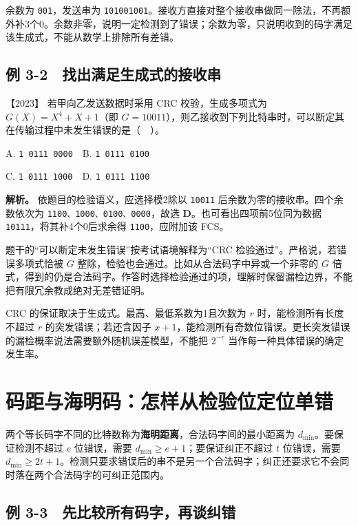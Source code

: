 余数为 \allowbreak{}\texttt{001}，发送串为 \allowbreak{}\texttt{101001001}。接收方直接对整个接收串做同一除法，不再额外补3个0。余数非零，说明一定检测到了错误；余数为零，只说明收到的码字满足该生成式，不能从数学上排除所有差错。

\subsection{例 3-2　找出满足生成式的接收串}\label{cn-ex3-2}

\noindent{}【2023】 若甲向乙发送数据时采用 CRC 校验，生成多项式为 \(G(X)=X^4+X+1\)（即 \(G=10011\)），则乙接收到下列比特串时，可以断定其在传输过程中未发生错误的是（　）。

A. \allowbreak{}\texttt{1\ 0111\ 0000}　B. \allowbreak{}\texttt{1\ 0111\ 0100}

C. \allowbreak{}\texttt{1\ 0111\ 1000}　D. \allowbreak{}\texttt{1\ 0111\ 1100}


\textbf{解析。} 依题目的检验语义，应选择模2除以 \allowbreak{}\texttt{10011} 后余数为零的接收串。四个余数依次为 \allowbreak{}\texttt{1100、1000、0100、0000}，故选 \textbf{D}。也可看出四项前5位同为数据 \allowbreak{}\texttt{10111}，将其补4个0后求余得 \allowbreak{}\texttt{1100}，应附加该 FCS。

题干的``可以断定未发生错误''按考试语境解释为``CRC 检验通过''。严格说，若错误多项式恰被 \(G\) 整除，检验也会通过。比如从合法码字中异或一个非零的 \(G\) 倍式，得到的仍是合法码字。作答时选择检验通过的项，理解时保留漏检边界，不能把有限冗余教成绝对无差错证明。

CRC 的保证取决于生成式。最高、最低系数为1且次数为 \(r\) 时，能检测所有长度不超过 \(r\) 的突发错误；若还含因子 \(x+1\)，能检测所有奇数位错误。更长突发错误的漏检概率说法需要额外随机误差模型，不能把 \(2^{-r}\) 当作每一种具体错误的确定发生率。

\section{码距与海明码：怎样从检验位定位单错}\label{cn-03-04}

两个等长码字不同的比特数称为\textbf{海明距离}，合法码字间的最小距离为 \(d_{\min}\)。要保证检测不超过 \(e\) 位错误，需要 \(d_{\min}\ge e+1\)；要保证纠正不超过 \(t\) 位错误，需要 \(d_{\min}\ge2t+1\)。检测只要求错误后的串不是另一个合法码字；纠正还要求它不会同时落在两个合法码字的可纠正范围内。

\subsection{例 3-3　先比较所有码字，再谈纠错}\label{cn-ex3-3}

